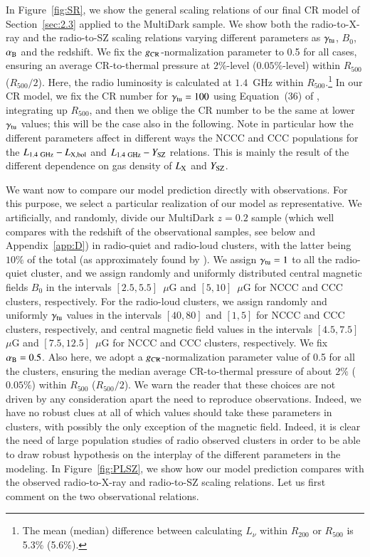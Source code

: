 \documentclass[traditabstract]{aa}
\newcommand{\rmn}{\mathrm}
\begin{document}
In Figure~\ref{fig:SR}, we show the general scaling relations of our final CR model of Section~\ref{sec:2.3} applied to the MultiDark sample. We show both the radio-to-X-ray  and the radio-to-SZ scaling relations varying different parameters as $\gamma_{\rm{tu}}$, $B_{0}$, $\alpha_{\rm{B}}$ and the redshift. We fix the $g_{\rm{CR}}$-normalization parameter to 0.5 for all cases, ensuring an average CR-to-thermal pressure at $2\%$-level ($0.05\%$-level) within $R_{500}$ ($R_{500}/2$). Here, the radio luminosity is calculated at $1.4$~GHz within $R_{500}.$\footnote[14]{The mean (median) difference between calculating $L_{\nu}$ within $R_{200}$ or $R_{500}$ is 5.3\% (5.6\%).} In our CR model, we fix the CR number for $\gamma_{\rm{tu}}=100$ using Equation~(36) of \cite{2011A&A...527A..99E}, integrating up $R_{500}$, and then we oblige the CR number to be the same at lower $\gamma_{\rm{tu}}$ values; this will be the case also in the following. Note in particular how the different parameters affect in different ways the NCCC and CCC populations for the $L_{1.4~\rmn{GHz}}-L_{\rm{X,bol}}$ and $L_{1.4~\rmn{GHz}}-Y_{\rm{SZ}}$ relations. This is mainly the result of the different dependence on gas density of $L_{\rm{X}}$ and $Y_{\rm{SZ}}$.

We want now to compare our model prediction directly with observations. For this purpose, we select a particular realization of our model as representative. We artificially, and randomly, divide our MultiDark $z=0.2$ sample (which well compares with the redshift of the observational samples, see below and Appendix~\ref{app:D}) in radio-quiet and radio-loud clusters, with the latter being $10\%$ of the total (as approximately found by \citealp{1999NewA....4..141G}). We assign $\gamma_{\rm{tu}}=1$ to all the radio-quiet cluster, and we assign randomly and uniformly distributed central magnetic fields $B_0$ in the intervals $[2.5,5.5]$~$\mu$G and $[5,10]$~$\mu$G for NCCC and CCC clusters, respectively. For the radio-loud clusters, we assign randomly and uniformly $\gamma_{\rm{tu}}$ values in the intervals $[40,80]$ and $[1,5]$ for NCCC and CCC clusters, respectively, and central magnetic field values in the intervals $[4.5,7.5]$~$\mu$G and $[7.5,12.5]$~$\mu$G for NCCC and CCC clusters, respectively. We fix $\alpha_{\rm{B}}=0.5$. Also here, we adopt a $g_{\rm{CR}}$-normalization parameter value of 0.5 for all the clusters, ensuring the median average CR-to-thermal pressure of about $2\%$ ($0.05\%$) within $R_{500}$ ($R_{500}/2$). We warn the reader that these choices are not driven by any consideration apart the need to reproduce observations. Indeed, we have no robust clues at all of which values should take these parameters in clusters, with possibly the only exception of the magnetic field. Indeed, it is clear the need of large population studies of radio observed clusters in order to be able to draw robust hypothesis on the interplay of the different parameters in the modeling. In Figure~\ref{fig:PLSZ}, we show how our model prediction compares with the observed radio-to-X-ray and radio-to-SZ scaling relations. Let us first comment on the two observational relations.
\end{document}
